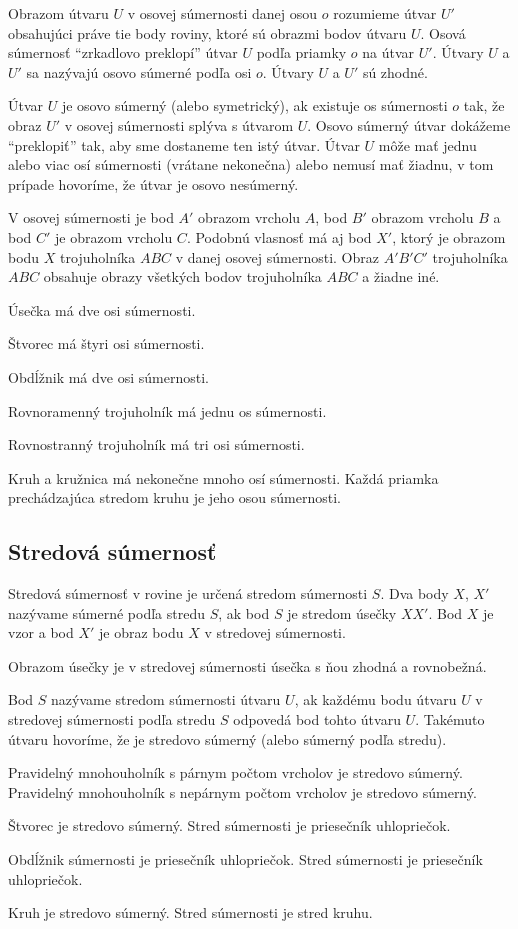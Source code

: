 \documentclass{report}
\begin{document}
Obrazom útvaru \(U\) v osovej súmernosti danej osou \(o\) rozumieme útvar \(U'\) obsahujúci práve tie body roviny, ktoré sú obrazmi bodov útvaru \(U\). Osová súmernosť \enquote{zrkadlovo preklopí} útvar \(U\) podľa priamky \(o\) na útvar \(U'\). Útvary \(U\) a \(U'\) sa nazývajú osovo súmerné podľa osi \(o\). Útvary \(U\) a \(U'\) sú zhodné.

Útvar \(U\) je osovo súmerný (alebo symetrický), ak existuje os súmernosti \(o\) tak, že obraz \(U'\) v osovej súmernosti splýva s útvarom \(U\). Osovo súmerný útvar dokážeme \enquote{preklopiť} tak, aby sme dostaneme ten istý útvar. Útvar \(U\) môže mať jednu alebo viac osí súmernosti (vrátane nekonečna) alebo nemusí mať žiadnu, v tom prípade hovoríme, že útvar je osovo nesúmerný.

V osovej súmernosti je bod \(A'\) obrazom vrcholu \(A\), bod \(B'\) obrazom vrcholu \(B\) a bod \(C'\) je obrazom vrcholu \(C\). Podobnú vlasnosť má aj bod \(X'\), ktorý je obrazom bodu \(X\) trojuholníka \(ABC\) v danej osovej súmernosti. Obraz \(A'B'C'\) trojuholníka \(ABC\) obsahuje obrazy všetkých bodov trojuholníka \(ABC\) a žiadne iné.

Úsečka má dve osi súmernosti.

Štvorec má štyri osi súmernosti.

Obdĺžnik má dve osi súmernosti.

Rovnoramenný trojuholník má jednu os súmernosti.

Rovnostranný trojuholník má tri osi súmernosti.

Kruh a kružnica má nekonečne mnoho osí súmernosti. Každá priamka prechádzajúca stredom kruhu je jeho osou súmernosti.

\subsection{Stredová súmernosť}

Stredová súmernosť v rovine je určená stredom súmernosti \(S\). Dva body \(X\), \(X'\) nazývame súmerné podľa stredu \(S\), ak bod \(S\) je stredom úsečky \(XX'\). Bod \(X\) je vzor a bod \(X'\) je obraz bodu \(X\) v stredovej súmernosti.

Obrazom úsečky je v stredovej súmernosti úsečka s ňou zhodná a rovnobežná.

Bod \(S\) nazývame stredom súmernosti útvaru \(U\), ak každému bodu útvaru \(U\) v stredovej súmernosti podľa stredu \(S\) odpovedá bod tohto útvaru \(U\). Takémuto útvaru hovoríme, že je stredovo súmerný (alebo súmerný podľa stredu).

Pravidelný mnohouholník s párnym počtom vrcholov je stredovo súmerný.
Pravidelný mnohouholník s nepárnym počtom vrcholov je stredovo súmerný.

Štvorec je stredovo súmerný. Stred súmernosti je priesečník uhlopriečok.

Obdĺžnik súmernosti je priesečník uhlopriečok. Stred súmernosti je priesečník uhlopriečok.

Kruh je stredovo súmerný. Stred súmernosti je stred kruhu.

\printbibliography
\end{document}
